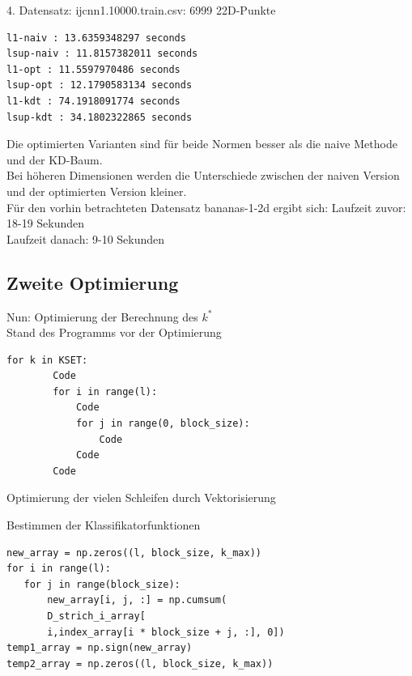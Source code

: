 \documentclass{beamer}
\begin{document}
\begin{frame}[fragile]
4. Datensatz: ijcnn1.10000.train.csv: 6999 
22D-Punkte
\begin{verbatim}
l1-naiv : 13.6359348297 seconds
lsup-naiv : 11.8157382011 seconds
l1-opt : 11.5597970486 seconds
lsup-opt : 12.1790583134 seconds
l1-kdt : 74.1918091774 seconds
lsup-kdt : 34.1802322865 seconds
\end{verbatim}
\end{frame}


\begin{frame}
Die optimierten Varianten sind für beide Normen besser als die naive Methode und der KD-Baum.\\
Bei höheren Dimensionen werden die Unterschiede zwischen der naiven Version und der optimierten Version kleiner.\\
Für den vorhin betrachteten Datensatz bananas-1-2d ergibt sich:
Laufzeit zuvor: 18-19 Sekunden\\
Laufzeit danach: 9-10 Sekunden
\end{frame}

\subsection{Zweite Optimierung}

\begin{frame}[fragile]
Nun: Optimierung der Berechnung des $k^*$\\
Stand des Programms vor der Optimierung
\begin{verbatim}
for k in KSET:
        Code
        for i in range(l):
            Code
            for j in range(0, block_size):
                Code
            Code
        Code
\end{verbatim}
Optimierung der vielen Schleifen durch Vektorisierung
\end{frame}

\begin{frame}[fragile]
Bestimmen der Klassifikatorfunktionen
\begin{verbatim}
new_array = np.zeros((l, block_size, k_max))  
for i in range(l):
   for j in range(block_size):
       new_array[i, j, :] = np.cumsum(
       D_strich_i_array[
       i,index_array[i * block_size + j, :], 0])
temp1_array = np.sign(new_array)
temp2_array = np.zeros((l, block_size, k_max))
\end{verbatim}
\end{frame}
\end{document}
